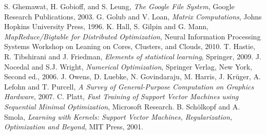 \documentclass[10pt,oneside, chapterprefix]{scrbook} %
\begin{document}
\begin{thebibliography}{99}
		{\sc S. Ghemawat, H. Gobioff, and S. Leung}, {\em The Google File System}, Google Research Publications, 2003.
		{\sc G. Golub and V. Loan}, {\em Matrix Computations}, Johns Hopkins University Press, 1996.
		{\sc K. Hall, S. Gilpin and G. Mann}, {\em MapReduce/Bigtable for Distributed Optimization}, Neural Information Processing Systems Workshop on Leaning on Cores, Clusters, and Clouds, 2010. 
		{\sc T. Hastie, R. Tibshirani and J. Friedman}, {\em Elements of statistical learning}, Springer, 2009. 
        {\sc J. Nocedal and S.J. Wright}, {\em Numerical Optimization}, 
         Springer Verlag, New York,  Second ed., 2006.
		{\sc J. Owens, D. Luebke, N. Govindaraju, M. Harris, J. Krüger, A. Lefohn and T. Purcell}, {\em A Survey of General-Purpose Computation on Graphics Hardware}, 2007. 
		{\sc C. Platt}, \emph{Fast Training of Support Vector Machines using Sequential Minimal Optimization}, Microsoft Research. 
		{\sc B. Schölkopf and A. Smola}, {\em Learning with Kernels: Support Vector Machines, Regularization, Optimization and Beyond}, MIT Press, 2001.
\end{thebibliography}

\end{document}
